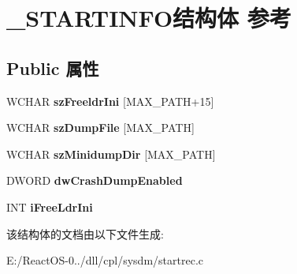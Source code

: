 \hypertarget{struct___s_t_a_r_t_i_n_f_o}{}\section{\+\_\+\+S\+T\+A\+R\+T\+I\+N\+F\+O结构体 参考}
\label{struct___s_t_a_r_t_i_n_f_o}
\subsection*{Public 属性}
\begin{DoxyCompactItemize}
\item 
\mbox{\label{struct___s_t_a_r_t_i_n_f_o_aa52154220df67a429b8d3778b208377c}} 
W\+C\+H\+AR {\bfseries sz\+Freeldr\+Ini} \mbox{[}M\+A\+X\+\_\+\+P\+A\+TH+15\mbox{]}
\item 
\mbox{\label{struct___s_t_a_r_t_i_n_f_o_a85583b69e5948f1af1f291f24ac8bc4b}} 
W\+C\+H\+AR {\bfseries sz\+Dump\+File} \mbox{[}M\+A\+X\+\_\+\+P\+A\+TH\mbox{]}
\item 
\mbox{\label{struct___s_t_a_r_t_i_n_f_o_a7c036526d78faa25b70fb3fd0f080b94}} 
W\+C\+H\+AR {\bfseries sz\+Minidump\+Dir} \mbox{[}M\+A\+X\+\_\+\+P\+A\+TH\mbox{]}
\item 
\mbox{\label{struct___s_t_a_r_t_i_n_f_o_a56acf100089d8cca732b55bec67bca1d}} 
D\+W\+O\+RD {\bfseries dw\+Crash\+Dump\+Enabled}
\item 
\mbox{\label{struct___s_t_a_r_t_i_n_f_o_a4c9c6b6c8a0ff0444179d8771b97f029}} 
I\+NT {\bfseries i\+Free\+Ldr\+Ini}
\end{DoxyCompactItemize}


该结构体的文档由以下文件生成\+:\begin{DoxyCompactItemize}
\item 
E\+:/\+React\+O\+S-\/0../dll/cpl/sysdm/startrec.\+c\end{DoxyCompactItemize}
